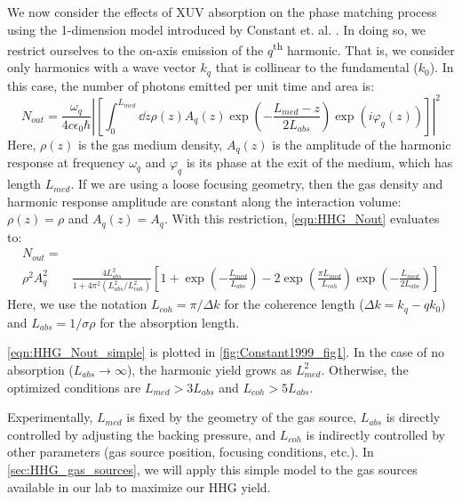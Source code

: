 We now consider the effects of XUV absorption on the phase matching process using the 1-dimension model introduced by Constant et. al. \cite{constantOptimizingHighHarmonic1999}. In doing so, we restrict ourselves to the on-axis emission of the $q$\textsuperscript{th} harmonic. That is, we consider only harmonics with a wave vector $k_q$ that is collinear to the fundamental ($k_0$). In this case, the number of photons emitted per unit time and area is:
\begin{equation}
N_{out} = \frac{\omega_q}{4 c \epsilon_0 \hbar} \left| \left[ \int_{0}^{L_{med}} \dd{z} \rho(z) A_q(z) \exp \left( - \frac{L_{med} - z}{2 L_{abs}}  \right) \exp \left( i \varphi_q(z) \right)  \right] \right|^2
\label{eqn:HHG_Nout}
\end{equation}
Here, $\rho(z)$ is the gas medium density, $A_q(z)$ is the amplitude of the harmonic response at frequency $\omega_q$ and $\varphi_q$ is its phase at the exit of the medium, which has length $L_{med}$. If we are using a loose focusing geometry, then the gas density and harmonic response amplitude are constant along the interaction volume: $\rho(z) = \rho$ and $A_q(z)=A_q$. With this restriction, \cref{eqn:HHG_Nout} evaluates to:
\begin{equation}
\begin{aligned}
N_{out} = & \\ \rho^2 A_q^2 & \frac{4L_{abs}^2}{1+4\pi^2(L_{abs}^2 / L_{coh}^2)} \left[ 1 + \exp\left(-\frac{L_{med}}{L_{abs}}\right) - 2 \exp\left(\frac{\pi L_{med}}{L_{coh}}\right) \exp\left(-\frac{L_{med}}{2L_{abs}}\right) \right]
\label{eqn:HHG_Nout_simple}
\end{aligned}
\end{equation}
Here, we use the notation $L_{coh} = \pi/\Delta k$ for the coherence length ($\Delta k = k_q - q k_0$) and $L_{abs} = 1/{\sigma \rho}$ for the absorption length.


\cref{eqn:HHG_Nout_simple} is plotted in \cref{fig:Constant1999_fig1}. In the case of no absorption ($L_{abs} \rightarrow \infty$), the harmonic yield grows as $L_{med}^2$. Otherwise, the optimized conditions are $L_{med} > 3 L_{abs}$ and $L_{coh} > 5 L_{abs}$.

Experimentally, $L_{med}$ is fixed by the geometry of the gas source, $L_{abs}$ is directly controlled by adjusting the backing pressure, and $L_{coh}$ is indirectly controlled by other parameters (gas source position, focusing conditions, etc.). In \cref{sec:HHG_gas_sources}, we will apply this simple model to the gas sources available in our lab to maximize our HHG yield.

